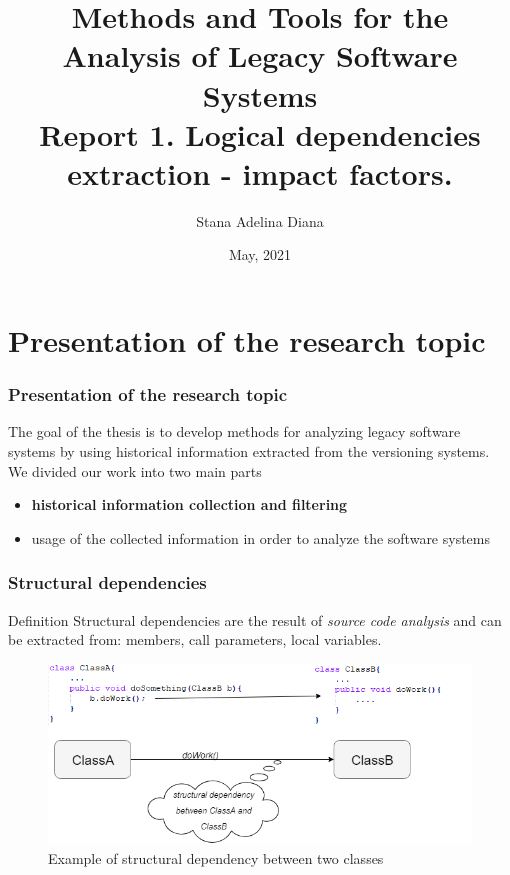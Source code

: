 \documentclass{beamer}
\title[Pres]{Methods and Tools for the Analysis of Legacy Software
Systems\\
Report 1. Logical dependencies extraction - impact factors.
 }
\author{Stana Adelina Diana}
\institute{Computer Science and Engineering Department\\
"Politehnica" University of Timisoara}
\date{May, 2021}
\begin{document}
\begin{frame}
  \titlepage
\end{frame}

\section{Presentation of the research topic}
 \begin{frame}
\frametitle{Presentation of the research topic}
The goal of the thesis is to develop methods for analyzing legacy software systems by using historical information extracted from the versioning systems.
We divided our work into two main parts

\begin{itemize}
\item \textbf{historical information collection and filtering}
\item usage of the collected information in order to analyze the software systems
\end{itemize}

\end{frame}


 \begin{frame}
\frametitle{Structural dependencies}
\begin{block}{Definition}
Structural dependencies are the result of \textit{source code analysis} and can be extracted from: members, call parameters, local variables. 
\end{block}

\begin{center}
     \begin{figure}
	\includegraphics[width=\textwidth]{structural_dep.png}
	\caption{\label{fig:fig}Example of structural dependency between two classes}
     \end{figure}
\end{center}

\end{frame}
\end{document}
